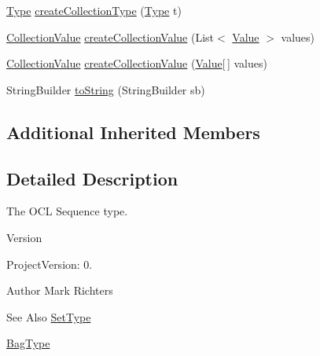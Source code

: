 \begin{DoxyCompactItemize}
\hyperlink{interfaceorg_1_1tzi_1_1use_1_1uml_1_1ocl_1_1type_1_1_type}{Type} \hyperlink{classorg_1_1tzi_1_1use_1_1uml_1_1ocl_1_1type_1_1_sequence_type_a696d365e9e55ba6e19d09aefcd924c54}{create\-Collection\-Type} (\hyperlink{interfaceorg_1_1tzi_1_1use_1_1uml_1_1ocl_1_1type_1_1_type}{Type} t)
\item 
\hyperlink{classorg_1_1tzi_1_1use_1_1uml_1_1ocl_1_1value_1_1_collection_value}{Collection\-Value} \hyperlink{classorg_1_1tzi_1_1use_1_1uml_1_1ocl_1_1type_1_1_sequence_type_a8c60509d27233fba10765fd0411a1036}{create\-Collection\-Value} (List$<$ \hyperlink{classorg_1_1tzi_1_1use_1_1uml_1_1ocl_1_1value_1_1_value}{Value} $>$ values)
\item 
\hyperlink{classorg_1_1tzi_1_1use_1_1uml_1_1ocl_1_1value_1_1_collection_value}{Collection\-Value} \hyperlink{classorg_1_1tzi_1_1use_1_1uml_1_1ocl_1_1type_1_1_sequence_type_aaa35ea3830bb4f575dc276d38eba2a79}{create\-Collection\-Value} (\hyperlink{classorg_1_1tzi_1_1use_1_1uml_1_1ocl_1_1value_1_1_value}{Value}\mbox{[}$\,$\mbox{]} values)
\item 
String\-Builder \hyperlink{classorg_1_1tzi_1_1use_1_1uml_1_1ocl_1_1type_1_1_sequence_type_a09ea2aabeb835f10549ee45a64b4885a}{to\-String} (String\-Builder sb)
\end{DoxyCompactItemize}
\subsection*{Additional Inherited Members}


\subsection{Detailed Description}
The O\-C\-L Sequence type.

\begin{DoxyVersion}{Version}

\end{DoxyVersion}
\begin{DoxyParagraph}{Project\-Version\-:}
0. 
\end{DoxyParagraph}
\begin{DoxyAuthor}{Author}
Mark Richters 
\end{DoxyAuthor}
\begin{DoxySeeAlso}{See Also}
\hyperlink{classorg_1_1tzi_1_1use_1_1uml_1_1ocl_1_1type_1_1_set_type}{Set\-Type} 

\hyperlink{classorg_1_1tzi_1_1use_1_1uml_1_1ocl_1_1type_1_1_bag_type}{Bag\-Type} 
\end{DoxySeeAlso}



